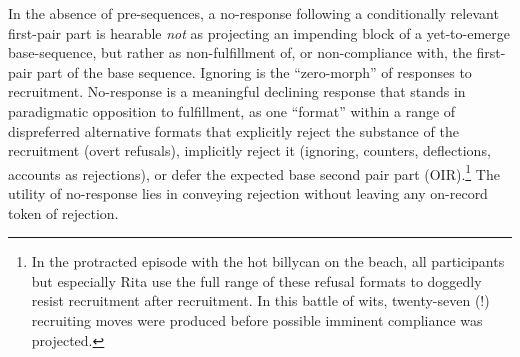 \documentclass[output=paper,nonflat,colorlinks,citecolor=brown]{langsci/langscibook}
\begin{document}
In the absence of pre-sequences, a no-response following a conditionally relevant first-pair part is hearable \textit{not} as projecting an impending block of a yet-to-emerge base-sequence, but rather as non-fulfillment of, or non-compliance with, the first-pair part of the base sequence. Ignoring is the “zero-morph” of responses to recruitment. No-response is a meaningful declining response that stands in paradigmatic opposition to fulfillment, as one “format” within a range of dispreferred alternative formats that explicitly reject the substance of the recruitment (overt refusals), implicitly reject it (ignoring, counters, deflections, accounts as rejections), or defer the expected base second pair part (OIR).\footnote{In the protracted episode with the hot billycan on the beach, all participants but especially Rita use the full range of these refusal formats to doggedly resist recruitment after recruitment. In this battle of wits, twenty-seven (!) recruiting moves were produced before possible imminent compliance was projected.} The utility of no-response lies in conveying rejection without leaving any on-record token of rejection.
\end{document}
